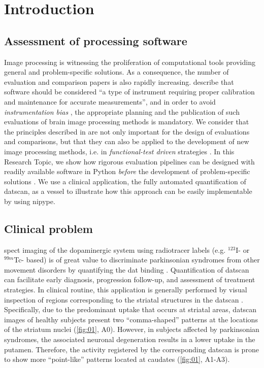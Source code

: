 \documentclass{frontiers}
\begin{document}

\glsresetall[\acronymtype]

\section{Introduction}\label{sec:intro}

\subsection{Assessment of processing software}
\label{sec:intro_software}
Image processing is witnessing the proliferation of computational tools
  providing general and problem-specific solutions.
As a consequence, the number of evaluation and comparison papers is
  also rapidly increasing.
\cite{tustison_instrumentation_2013} describe that software should be considered 
 ``a type of instrument requiring proper calibration and maintenance for accurate measurements'', 
  and in order to avoid \emph{instrumentation bias} \citep{shattuck_online_2009}, the appropriate planning 
  and the publication of such evaluations of brain image processing methods is mandatory. 
We consider that the principles described in \citep{tustison_instrumentation_2013} are not only
  important for the design of evaluations and comparisons, 
  but that they can also be applied to the development of new image processing
  methods, i.e. in \emph{functional-test driven} strategies \citep{andrea_envisioning_2007}.
In this Research Topic, we show how rigorous evaluation pipelines can be designed
  with readily available software in Python \emph{before} the development of 
  problem-specific solutions .
We use a clinical application, the fully automated quantification of \gls*{datscan},
  as a vessel to illustrate how this approach can be easily implementable by 
  using \gls*{nipype}.

\subsection{Clinical problem}\label{sec:intro_problem}
\Gls*{spect} imaging of the dopaminergic system using
  radiotracer labels (e.g. $^{123}$I- or $^{99m}$Tc- based) is of great
  value to discriminate parkinsonian syndromes from other movement
  disorders by quantifying the \acrlong*{dat} binding \citep{booij_[123i]fp-cit_1997}.
Quantification of \gls*{datscan} can facilitate early 
  diagnosis, progression follow-up, and assessment of treatment
  strategies. 
In clinical routine, this application is generally
  performed by visual inspection of regions corresponding to the
  striatal structures in the \gls*{datscan} \citep{bajaj_clinical_2013}.
Specifically, due to the predominant uptake that occurs at striatal areas,
  \gls*{datscan} images of healthy subjects present two
  ``comma-shaped'' patterns at the locations of the striatum nuclei
  (\autoref{fig:01}, A0).
However, in subjects affected by parkinsonian syndromes, the associated
  neuronal degeneration results in a lower uptake in the putamen.
Therefore, the activity registered by the corresponding \gls*{datscan}
  is prone to show more ``point-like'' patterns located at
  caudates (\autoref{fig:01}, A1-A3).
\end{document}
